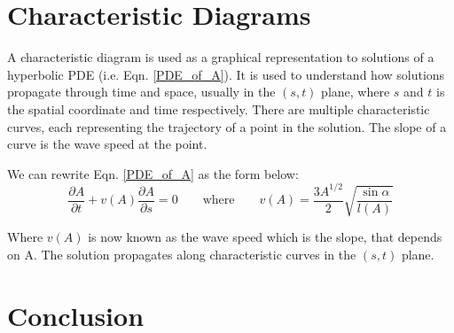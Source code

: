\documentclass[12pt]{article}
\begin{document}
\section{Characteristic Diagrams}
A characteristic diagram is used as a graphical representation to solutions of a hyperbolic PDE (i.e. Eqn. \ref{PDE_of_A}). It is used to understand how solutions propagate through time and space, usually in the $(s, t)$ plane, where $s$ and $t$ is the spatial coordinate and time respectively. There are multiple characteristic curves, each representing the trajectory of a point in the solution. The slope of a curve is the wave speed at the point.

We can rewrite Eqn. \ref{PDE_of_A} as the form below:
\begin{equation}
    \frac{\partial A}{\partial t} + v(A) \frac{\partial A}{\partial s} = 0\qquad 
    \text{where} 
    \qquad v(A) = \frac{3A^{1/2}}{2}\sqrt{\frac{\sin \alpha}{l (A)}}
\end{equation}

Where $v(A)$ is now known as the wave speed which is the slope, that depends on A. The solution propagates along characteristic curves in the $(s, t)$ plane.


\section{Conclusion}




\end{document}
